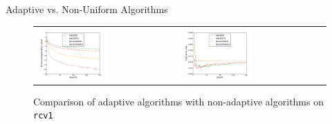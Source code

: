 \begin{frame}{Adaptive vs. Non-Uniform Algorithms}
\begin{figure}[htbp]
\begin{tabular}{ll}
    \centering
        \includegraphics[width=0.5\textwidth]{images/comp_all_obej.pdf} &
        \includegraphics[width=0.5\textwidth]{images/comp_all_terror.pdf}
    \end{tabular}
    \caption{Comparison of adaptive algorithms with non-adaptive algorithms on \texttt{rcv1}} 
    \label{fig:comp_all1}
\end{figure}
\end{frame}


